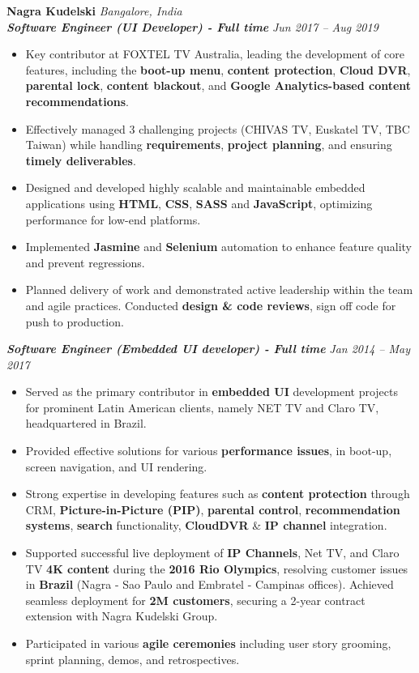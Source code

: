 \documentclass[11pt,a4paper]{article}
\newcommand{\resumeItem}[1]{\item #1}
\newcommand{\jobheading}[4]{%
  \noindent\textbf{#1} \hfill \textit{#2} \\
  \textit{\textbf{#3}} \hfill \textit{#4}
}
\begin{document}
\vspace{6pt}
\jobheading{Nagra Kudelski}{Bangalore, India}{Software Engineer (UI Developer) - Full time}{Jun 2017 -- Aug 2019}

\begin{itemize}[leftmargin=1.5em, itemsep=1pt, topsep=3pt, label=\textopenbullet]
  \resumeItem{Key contributor at FOXTEL TV Australia, leading the development of core features, including the \textbf{boot-up menu}, \textbf{content protection}, \textbf{Cloud DVR}, \textbf{parental lock}, \textbf{content blackout}, and \textbf{Google Analytics-based content recommendations}.}
  \resumeItem{Effectively managed 3 challenging projects (CHIVAS TV, Euskatel TV, TBC Taiwan) while handling \textbf{requirements}, \textbf{project planning}, and ensuring \textbf{timely deliverables}.}
  \resumeItem{Designed and developed highly scalable and maintainable embedded applications using \textbf{HTML}, \textbf{CSS}, \textbf{SASS} and \textbf{JavaScript}, optimizing performance for low-end platforms.}
  \resumeItem{Implemented \textbf{Jasmine} and \textbf{Selenium} automation to enhance feature quality and prevent regressions.}
  \resumeItem{Planned delivery of work and demonstrated active leadership within the team and agile practices. Conducted \textbf{design \& code reviews}, sign off code for push to production.}
\end{itemize}

\vspace{4pt}
\noindent\textit{\textbf{Software Engineer (Embedded UI developer) - Full time}} \hfill \textit{Jan 2014 -- May 2017}

\begin{itemize}[leftmargin=1.5em, itemsep=1pt, topsep=3pt, label=\textopenbullet]
  \resumeItem{Served as the primary contributor in \textbf{embedded UI} development projects for prominent Latin American clients, namely NET TV and Claro TV, headquartered in Brazil.}
  \resumeItem{Provided effective solutions for various \textbf{performance issues}, in boot-up, screen navigation, and UI rendering.}
  \resumeItem{Strong expertise in developing features such as \textbf{content protection} through CRM, \textbf{Picture-in-Picture (PIP)}, \textbf{parental control}, \textbf{recommendation systems}, \textbf{search} functionality, \textbf{CloudDVR} \& \textbf{IP channel} integration.}
  \resumeItem{Supported successful live deployment of \textbf{IP Channels}, Net TV, and Claro TV \textbf{4K content} during the \textbf{2016 Rio Olympics}, resolving customer issues in \textbf{Brazil} (Nagra - Sao Paulo and Embratel - Campinas offices). Achieved seamless deployment for \textbf{2M customers}, securing a 2-year contract extension with Nagra Kudelski Group.}
  \resumeItem{Participated in various \textbf{agile ceremonies} including user story grooming, sprint planning, demos, and retrospectives.}
\end{itemize}
\end{document}
